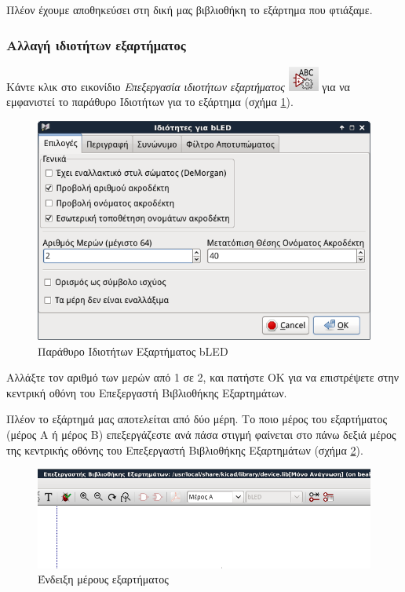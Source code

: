 \documentclass[a4paper]{article}
\begin{document}
Πλέον έχουμε αποθηκεύσει στη δική μας βιβλιοθήκη το εξάρτημα που φτιάξαμε.

\subsubsection{Αλλαγή ιδιοτήτων εξαρτήματος}
Κάντε κλικ στο εικονίδιο \textit{Επεξεργασία ιδιοτήτων εξαρτήματος} \includegraphics[scale=.5]{img/libed-ico-compprop.png} 
για να εμφανιστεί το παράθυρο Ιδιοτήτων για το εξάρτημα (σχήμα \ref{fig:libed-dial-bledprop}). 

\begin{figure}
  \begin{center}
    \includegraphics[width=.5\textwidth]{img/libed-dial-bledprop.png}
    \caption{Παράθυρο Ιδιοτήτων Εξαρτήματος bLED}
    \label{fig:libed-dial-bledprop}
  \end{center}
\end{figure}

Αλλάξτε τον αριθμό των μερών από 1 σε 2, και πατήστε ΟΚ για να επιστρέψετε στην κεντρική οθόνη του Επεξεργαστή Βιβλιοθήκης Εξαρτημάτων.

Πλέον το εξάρτημά μας αποτελείται από δύο μέρη. Το ποιο μέρος του εξαρτήματος (μέρος Α ή μέρος Β) επεξεργάζεστε ανά πάσα στιγμή φαίνεται στο πάνω δεξιά μέρος της κεντρικής οθόνης του Επεξεργαστή Βιβλιοθήκης Εξαρτημάτων (σχήμα \ref{fig:libed-ui-unit}).

\begin{figure}
  \begin{center}
    \includegraphics[width=.5\textwidth]{img/libed-ui-unit.png}
    \caption{Ένδειξη μέρους εξαρτήματος}
    \label{fig:libed-ui-unit}
  \end{center}
\end{figure}
\end{document}
